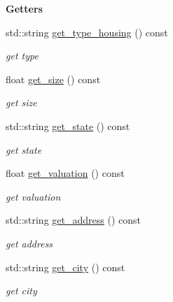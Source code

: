 \begin{Indent}{\bf Getters}\par
\begin{DoxyCompactItemize}
\item 
std\+::string \hyperlink{class_c_housing_a42f83879e84b7fc7a0a179459d9ec06c}{get\+\_\+type\+\_\+housing} () const 
\begin{DoxyCompactList}\small\item\em get type \end{DoxyCompactList}\item 
float \hyperlink{class_c_housing_a8732a56624fd5755a24a97894d30ad97}{get\+\_\+size} () const 
\begin{DoxyCompactList}\small\item\em get size \end{DoxyCompactList}\item 
std\+::string \hyperlink{class_c_housing_a1aaf9cb538de5c857ac251ed4a397361}{get\+\_\+state} () const 
\begin{DoxyCompactList}\small\item\em get state \end{DoxyCompactList}\item 
float \hyperlink{class_c_housing_a07a7aaca212ab39ba94857f3f06c95b2}{get\+\_\+valuation} () const 
\begin{DoxyCompactList}\small\item\em get valuation \end{DoxyCompactList}\item 
std\+::string \hyperlink{class_c_housing_a0220d7211ea0a81a3df1c3355504be20}{get\+\_\+address} () const 
\begin{DoxyCompactList}\small\item\em get address \end{DoxyCompactList}\item 
std\+::string \hyperlink{class_c_housing_a7de47dffc81d95eeafb7d53cfe238cad}{get\+\_\+city} () const 
\begin{DoxyCompactList}\small\item\em get city \end{DoxyCompactList}\end{DoxyCompactItemize}
\end{Indent}
